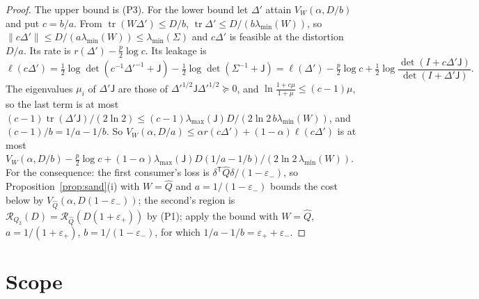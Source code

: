 \documentclass[11pt,onecolumn]{IEEEtran}
\newcommand{\tr}{\operatorname{tr}}
\newcommand{\cR}{\mathcal R}
\newcommand{\epp}{\varepsilon_{+}}
\newcommand{\emm}{\varepsilon_{-}}
\newcommand{\lmin}{\lambda_{\min}}
\newcommand{\lmax}{\lambda_{\max}}
\begin{document}
\begin{proof}
The upper bound is (P3). For the lower bound let $\Delta'$ attain $V_W(\alpha,D/b)$
and put $c=b/a$. From $\tr(W\Delta')\le D/b$, $\tr\Delta'\le D/(b\lmin(W))$, so
$\|c\Delta'\|\le D/(a\lmin(W))\le\lmin(\Sigma)$ and $c\Delta'$ is feasible at the
distortion $D/a$. Its rate is $r(\Delta')-\tfrac p2\log c$. Its leakage is
\[
\ell(c\Delta')=\tfrac12\log\det(c^{-1}\Delta'^{-1}+\mathsf J)-\tfrac12\log\det(\Sigma^{-1}+\mathsf J)
=\ell(\Delta')-\tfrac p2\log c+\tfrac12\log\frac{\det(I+c\Delta'\mathsf J)}{\det(I+\Delta'\mathsf J)}.
\]
The eigenvalues $\mu_i$ of $\Delta'\mathsf J$ are those of
$\Delta'^{1/2}\mathsf J\Delta'^{1/2}\succeq0$, and
$\ln\frac{1+c\mu}{1+\mu}\le(c-1)\mu$, so the last term is at most
$(c-1)\tr(\Delta'\mathsf J)/(2\ln2)\le(c-1)\lmax(\mathsf J)D/(2\ln2\,b\lmin(W))$, and
$(c-1)/b=1/a-1/b$. So $V_W(\alpha,D/a)\le\alpha r(c\Delta')+(1-\alpha)\ell(c\Delta')$ is
at most $V_W(\alpha,D/b)-\tfrac p2\log c+(1-\alpha)\lmax(\mathsf J)D(1/a-1/b)/(2\ln2\,\lmin(W))$.
For the consequence: the first consumer's loss is $\delta^{\mathsf T}\hat Q\delta/(1-\emm)$,
so Proposition~\ref{prop:sand}(i) with $W=\hat Q$ and $a=1/(1-\emm)$ bounds the cost
below by $V_{\hat Q}(\alpha,D(1-\emm))$; the second's region is
$\cR_{Q_2}(D)=\cR_{\hat Q}(D(1+\epp))$ by (P1); apply the bound with $W=\hat Q$,
$a=1/(1+\epp)$, $b=1/(1-\emm)$, for which $1/a-1/b=\epp+\emm$.
\end{proof}

\section{Scope}
\end{document}
